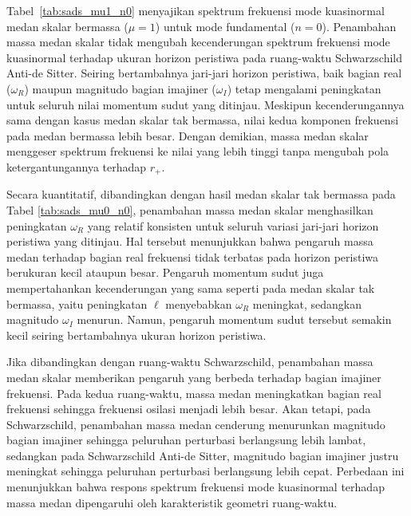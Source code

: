 Tabel~\ref{tab:sads_mu1_n0} menyajikan spektrum frekuensi mode kuasinormal medan skalar bermassa ($\mu=1$) untuk mode fundamental ($n=0$). Penambahan massa medan skalar tidak mengubah kecenderungan spektrum frekuensi mode kuasinormal terhadap ukuran horizon peristiwa pada ruang-waktu Schwarzschild Anti-de Sitter. Seiring bertambahnya jari-jari horizon peristiwa, baik bagian real ($\omega_R$) maupun magnitudo bagian imajiner ($\omega_I$) tetap mengalami peningkatan untuk seluruh nilai momentum sudut yang ditinjau. Meskipun kecenderungannya sama dengan kasus medan skalar tak bermassa, nilai kedua komponen frekuensi pada medan bermassa lebih besar. Dengan demikian, massa medan skalar menggeser spektrum frekuensi ke nilai yang lebih tinggi tanpa mengubah pola ketergantungannya terhadap $r_+$.

Secara kuantitatif, dibandingkan dengan hasil medan skalar tak bermassa pada Tabel \ref{tab:sads_mu0_n0}, penambahan massa medan skalar menghasilkan peningkatan $\omega_R$ yang relatif konsisten untuk seluruh variasi jari-jari horizon peristiwa yang ditinjau. Hal tersebut menunjukkan bahwa pengaruh massa medan terhadap bagian real frekuensi tidak terbatas pada horizon peristiwa berukuran kecil ataupun besar. Pengaruh momentum sudut juga mempertahankan kecenderungan yang sama seperti pada medan skalar tak bermassa, yaitu peningkatan $\ell$ menyebabkan $\omega_R$ meningkat, sedangkan magnitudo $\omega_I$ menurun. Namun, pengaruh momentum sudut tersebut semakin kecil seiring bertambahnya ukuran horizon peristiwa.

Jika dibandingkan dengan ruang-waktu Schwarzschild, penambahan massa medan skalar memberikan pengaruh yang berbeda terhadap bagian imajiner frekuensi. Pada kedua ruang-waktu, massa medan meningkatkan bagian real frekuensi sehingga frekuensi osilasi menjadi lebih besar. Akan tetapi, pada Schwarzschild, penambahan massa medan cenderung menurunkan magnitudo bagian imajiner sehingga peluruhan perturbasi berlangsung lebih lambat, sedangkan pada Schwarzschild Anti-de Sitter, magnitudo bagian imajiner justru meningkat sehingga peluruhan perturbasi berlangsung lebih cepat. Perbedaan ini menunjukkan bahwa respons spektrum frekuensi mode kuasinormal terhadap massa medan dipengaruhi oleh karakteristik geometri ruang-waktu.


